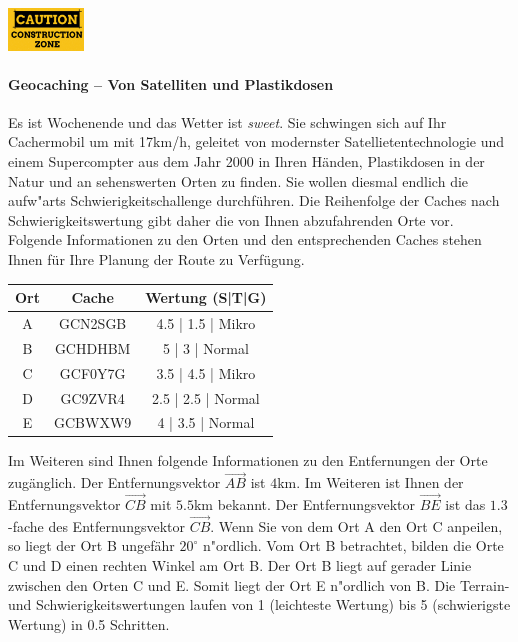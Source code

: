 \documentclass[a4paper, 10pt]{scrartcl}\usepackage[]{graphicx}\usepackage[]{xcolor}
\begin{document}
\hfill\href{foo}{\includegraphics[width =
  2cm]{img/caution}} %
\hspace{2Ex}

\paragraph{Geocaching -- Von Satelliten und Plastikdosen}



Es ist Wochenende und das Wetter ist \textit{sweet}. Sie schwingen sich auf
Ihr Cachermobil um mit 17km/h, geleitet von modernster
Satellietentechnologie und einem Supercompter aus dem Jahr 2000 in Ihren
H{\"a}nden, Plastikdosen in der Natur und an sehenswerten Orten zu finden. Sie
wollen diesmal endlich die aufw{"a}rts Schwierigkeitschallenge durchf{\"u}hren. Die
Reihenfolge der Caches nach Schwierigkeitswertung gibt daher die von Ihnen
abzufahrenden Orte vor. Folgende Informationen zu den Orten und den
entsprechenden Caches stehen Ihnen f{\"u}r Ihre Planung der Route zu Verf{\"u}gung.

\begin{center}
  \begin{tabular}{ ccc }
    \toprule
    Ort & Cache & Wertung (S|T|G) \\
    \midrule
    A & GCN2SGB & 4.5 | 1.5 | Mikro \\
    B & GCHDHBM & 5 | 3 | Normal \\ 
    C & GCF0Y7G & 3.5 | 4.5 | Mikro \\ 
    D & GC9ZVR4 & 2.5 | 2.5 | Normal \\ 
    E & GCBWXW9 & 4 | 3.5 | Normal \\     
 \bottomrule
\end{tabular}
\end{center}

Im Weiteren sind Ihnen folgende Informationen zu den Entfernungen der Orte
zug{\"a}nglich. Der Entfernungsvektor $\overrightarrow{AB}$ ist
$4$km. Im Weiteren ist Ihnen der Entfernungsvektor
$\overrightarrow{CB}$ mit $5.5$km bekannt. Der
Entfernungsvektor $\overrightarrow{BE}$ ist das $1.3$-fache
des Entfernungsvektor $\overrightarrow{CB}$. Wenn Sie von dem Ort A den Ort
C anpeilen, so liegt der Ort B ungef{\"a}hr $20^\circ$
n{"o}rdlich. Vom Ort B betrachtet, bilden die Orte C und D einen
rechten Winkel am Ort B. Der Ort B liegt auf gerader Linie zwischen den
Orten C und E. Somit liegt der Ort E n{"o}rdlich von B. Die
Terrain- und Schwierigkeitswertungen laufen von 1 (leichteste Wertung) bis
5 (schwierigste Wertung) in 0.5 Schritten. \\
\end{document}
